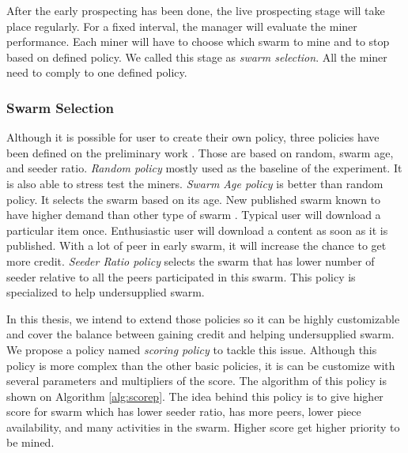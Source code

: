 After the early prospecting has been done, the live prospecting stage will take place regularly. For a fixed interval, the manager will evaluate the miner performance. Each miner will have to choose which swarm to mine and to stop based on defined policy. We called this stage as \textit{swarm selection}. All the miner need to comply to one defined policy. 

\subsubsection{Swarm Selection}
Although it is possible for user to create their own policy, three policies have been defined on the preliminary work \cite{2015:creditmining:capota}. Those are based on random, swarm age, and seeder ratio. \textit{Random policy} mostly used as the baseline of the experiment. It is also able to stress test the miners. \textit{Swarm Age policy} is better than random policy. It selects the swarm based on its age. New published swarm known to have higher demand than other type of swarm \cite{2012:economicbt:kash}. Typical user will download a particular item once. Enthusiastic user will download a content as soon as it is published. With a lot of peer in early swarm, it will increase the chance to get more credit. \textit{Seeder Ratio policy} selects the swarm that has lower number of seeder relative to all the peers participated in this swarm. This policy is specialized to help undersupplied swarm. 

In this thesis, we intend to extend those policies so it can be highly customizable and cover the balance between gaining credit and helping undersupplied swarm. We propose a policy named \textit{scoring policy} to tackle this issue. Although this policy is more complex than the other basic policies, it is can be customize with several parameters and multipliers of the score. The algorithm of this policy is shown on Algorithm \ref{alg:scorep}. The idea behind this policy is to give higher score for swarm which has lower seeder ratio, has more peers, lower piece availability, and many activities in the swarm. Higher score get higher priority to be mined.

